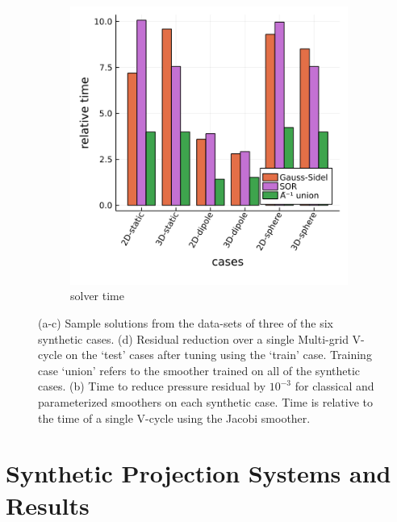 \documentclass[review]{elsarticle}
\begin{document}
\begin{figure}
\begin{subfigure}[b]{0.47\textwidth}
        \includegraphics[width=\textwidth]{figures/synthetic_timing.png}
        \caption{solver time}
        \label{fig:synthetic time}
    \end{subfigure}
    \caption{(a-c) Sample solutions from the data-sets of three of the six synthetic cases. (d) Residual reduction over a single Multi-grid V-cycle on the `test' cases after tuning using the `train' case. Training case `union' refers to the smoother trained on all of the synthetic cases. (b) Time to reduce pressure residual by $10^{-3}$ for classical and parameterized smoothers on each synthetic case. Time is relative to the time of a single V-cycle using the Jacobi smoother.}
    \label{fig:synthetic cases}
\end{figure}

\section{Synthetic Projection Systems and Results}
\end{document}
